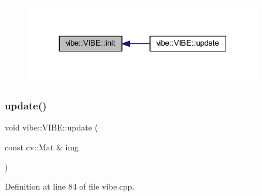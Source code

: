 \begin{figure}[H]
\begin{center}
\leavevmode
\includegraphics[width=293pt]{classvibe_1_1_v_i_b_e_a4db865cd319617161c13e4303471c33e_icgraph}
\end{center}
\end{figure}
\mbox{\label{classvibe_1_1_v_i_b_e_a9730e3695fa085ae907767390b3ad3de}} 
\subsubsection{\texorpdfstring{update()}{update()}}
{\footnotesize\ttfamily void vibe\+::\+V\+I\+B\+E\+::update (\begin{DoxyParamCaption}\item[{const cv\+::\+Mat \&}]{img }\end{DoxyParamCaption})}



Definition at line 84 of file vibe.\+cpp.


